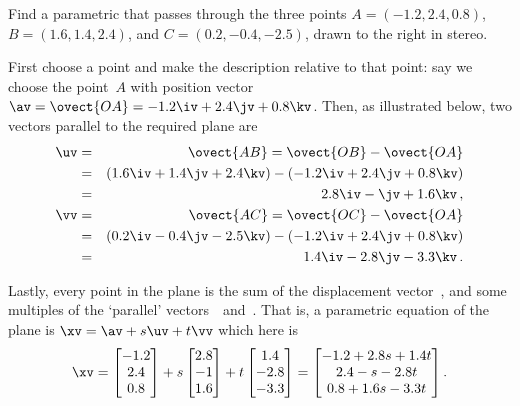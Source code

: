 \begin{example} 
Find a parametric  that passes through the three points \(A=(-1.2,2.4,0.8)\), \(B=(1.6,1.4,2.4)\), and \(C=(0.2,-0.4,-2.5)\), drawn to the right in stereo.

\begin{solution} 
First choose a point and make the description relative to that point: say we choose the point~\(A\) with position vector \(\av=\ovect{OA}=-1.2\iv+2.4\jv+0.8\kv\).
Then, as illustrated below, two vectors parallel to the required plane are 
\begin{eqnarray*}
\uv&=&\ovect{AB} =\ovect{OB}-\ovect{OA} 
\\&=&(1.6\iv+1.4\jv+2.4\kv)-(-1.2\iv+2.4\jv+0.8\kv) 
\\&=&2.8\iv-\jv+1.6\kv\,,
\\\vv&=&\ovect{AC} =\ovect{OC}-\ovect{OA} 
\\&=&(0.2\iv-0.4\jv-2.5\kv)-(-1.2\iv+2.4\jv+0.8\kv) 
\\&=&1.4\iv-2.8\jv-3.3\kv\,.
\end{eqnarray*}
\begin{center}\end{center}
Lastly, every point in the plane is the sum of the displacement vector~\av, and some multiples of the `parallel' vectors~\uv\ and~\vv.
That is, a parametric equation of the plane is \(\xv=\av+s\uv+t\vv\) which here is
\begin{equation*}
\xv=\begin{bmatrix} -1.2\\2.4\\0.8 \end{bmatrix}
+s\begin{bmatrix} 2.8\\-1\\1.6 \end{bmatrix}
+t\begin{bmatrix} 1.4\\-2.8\\-3.3 \end{bmatrix}
=\begin{bmatrix} -1.2+2.8s+1.4t\\2.4-s-2.8t\\0.8+1.6s-3.3t \end{bmatrix}.
\end{equation*}
\end{solution}
\end{example}
\endgroup



